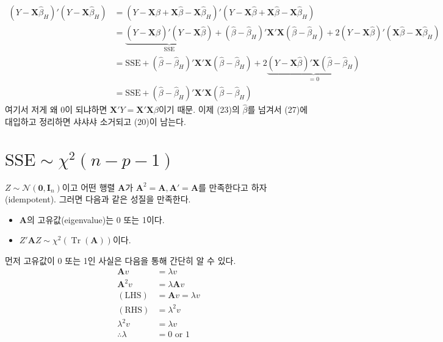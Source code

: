 \documentclass[answers]{exam}
\DeclareMathOperator{\Tr}{Tr}
\begin{document}
   \begin{align}
    \left(Y-\mathbf{X}\widehat{\beta}_{H}\right)'\left(Y-\mathbf{X}\widehat{\beta}_{H}\right) &= \left(Y-\mathbf{X}\widehat{\beta}+\mathbf{X}\widehat{\beta}-\mathbf{X}\widehat{\beta}_{H}\right)'\left(Y-\mathbf{X}\widehat{\beta}+\mathbf{X}\widehat{\beta}-\mathbf{X}\widehat{\beta}_{H}\right)\\
    &= \underbrace{\left(Y-\mathbf{X}\widehat{\beta}\right)'\left(Y-\mathbf{X}\widehat{\beta}\right)}_{\text{SSE}} +\left(\widehat{\beta}-\widehat{\beta}_{H}\right)'\mathbf{X}'\mathbf{X}\left(\widehat{\beta}-\widehat{\beta}_{H}\right)+2\left(Y-\mathbf{X}\widehat{\beta}\right)'\left(\mathbf{X}\widehat{\beta}-\mathbf{X}\widehat{\beta}_{H}\right)\\
    &= \mathrm{SSE}+\left(\widehat{\beta}-\widehat{\beta}_{H}\right)'\mathbf{X}'\mathbf{X}\left(\widehat{\beta}-\widehat{\beta}_{H}\right)+2\underbrace{\left(Y-\mathbf{X}\widehat{\beta}\right)'\mathbf{X}\left(\widehat{\beta}-\widehat{\beta}_{H}\right)}_{=0}\\
    &= \mathrm{SSE}+\left(\widehat{\beta}-\widehat{\beta}_{H}\right)'\mathbf{X}'\mathbf{X}\left(\widehat{\beta}-\widehat{\beta}_{H}\right)
   \end{align}
    여기서 저게 왜 0이 되냐하면 $\mathbf{X}'Y= \mathbf{X}'\mathbf{X}\widehat{\beta}$이기 때문. 이제 (23)의 $\widehat{\beta}$를 넘겨서 (27)에 대입하고 정리하면 샤샤샤 소거되고 (20)이 남는다.
    \section{$\mathrm{SSE}\sim \chi^{2}\left(n-p-1\right)$}
    $Z \sim \mathcal{N}\left(\mathbf{0},\mathbf{I}_{n}\right)$이고 어떤 행렬 $\mathbf{A}$가 $\mathbf{A}^{2}=\mathbf{A}, \mathbf{A}'=\mathbf{A}$를 만족한다고 하자(idempotent). 그러면 다음과 같은 성질을 만족한다.
    \begin{itemize}
      \item $\mathbf{A}$의 고유값(eigenvalue)는 0 또는 1이다.
      \item $Z'\mathbf{A}Z\sim \chi^{2}\left(\Tr\left(\mathbf{A}\right)\right)$이다.
    \end{itemize}
    먼저 고유값이 0 또는 1인 사실은 다음을 통해 간단히 알 수 있다.
    \begin{align}
      \mathbf{A}v &= \lambda v\\
      \mathbf{A}^{2}v &= \lambda \mathbf{A}v\\
      \left(\mathrm{LHS}\right) &= \mathbf{A}v = \lambda v\\
      \left(\mathrm{RHS}\right) &= \lambda^{2}v\\
      \lambda^{2}v &= \lambda v\\
      \therefore \lambda &= 0\text{ or } 1
    \end{align}
    
\end{document}
